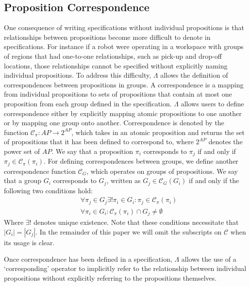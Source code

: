 \subsection{Proposition Correspondence} 
One consequence of writing specifications without individual propositions is that relationships between propositions become more difficult to denote in specifications. 
For instance if a robot were operating in a workspace with groups of regions that had one-to-one relationships, such as pick-up and drop-off locations, those relationships cannot be specified without explicitly naming individual propositions. 
To address this difficulty, $\Lambda$ allows the definition of correspondences between propositions in groups. 
A correspondence is a mapping from individual propositions to sets of propositions that contain at most one proposition from each group defined in the specification. 
$\Lambda$ allows users to define correspondence either by explicitly mapping atomic propositions to one another or by mapping one group onto another. 
Correspondence is denoted by the function $\mathcal{C}_\pi: AP \rightarrow 2^{AP}$, which takes in an atomic proposition and returns the set of propositions that it has been defined to correspond to, where $2^{AP}$ denotes the power set of $AP$. We say that a proposition $\pi_i$ corresponds to $\pi_j$ if and only if $\pi_j \in \mathcal{C}_\pi(\pi_i)$. 
For defining correspondences between groups, we define another correspondence function $\mathcal{C}_G$, which operates on groups of propositions. 
We say that a group $G_i$ corresponds to $G_j$, written as $G_j \in \mathcal{C}_G(G_i)$ if and only if the following two conditions hold:
\begin{subequations}
\begin{align}
	&\forall \pi_j \in G_j \exists! \pi_i \in G_i : \pi_j \in \mathcal{C}_\pi(\pi_i) \\
	&\forall \pi_i \in G_i : \mathcal{C}_\pi(\pi_i) \cap G_j \neq \emptyset
\end{align}
\end{subequations}
Where $\exists!$ denotes unique existence. 
Note that these conditions necessitate that $|G_i| = |G_j|$. %
In the remainder of this paper we will omit the subscripts on $\mathcal{C}$ when its usage is clear. 
\par Once correspondence has been defined in a specification, $\Lambda$ allows the use of a `corresponding' operator to implicitly refer to the relationship between individual propositions without explicitly referring to the propositions themselves. 
